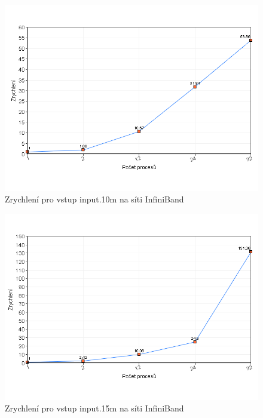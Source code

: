 \documentclass[12pt]{article}
\begin{document}
\begin{figure}[ht]
\begin{center}
\includegraphics[width=15cm]{input_10m_infiniband}
\end{center}
\caption{Zrychlení pro vstup input.10m na síti InfiniBand}
\end{figure}

\begin{figure}[ht]
\begin{center}
\includegraphics[width=15cm]{input_15m_infiniband}
\end{center}
\caption{Zrychlení pro vstup input.15m na síti InfiniBand}
\end{figure}
\end{document}
